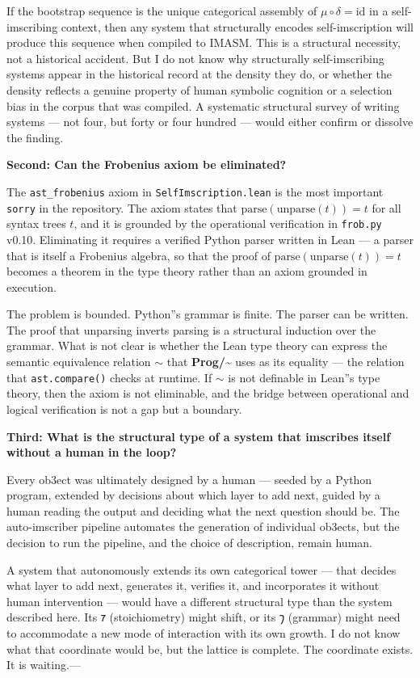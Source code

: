 \documentclass[12pt,a4paper]{article}
\begin{document}
If the bootstrap sequence is the unique categorical assembly of $\mu\circ\delta = \mathrm{id}$ in a self-imscribing context, then any system that structurally encodes self-imscription will produce this sequence when compiled to IMASM. This is a structural necessity, not a historical accident. But I do not know why structurally self-imscribing systems appear in the historical record at the density they do, or whether the density reflects a genuine property of human symbolic cognition or a selection bias in the corpus that was compiled. A systematic structural survey of writing systems --- not four, but forty or four hundred --- would either confirm or dissolve the finding.

\textbf{Second: Can the Frobenius axiom be eliminated?}

The \texttt{ast\_frobenius} axiom in \texttt{SelfImscription.lean} is the most important \texttt{sorry} in the repository. The axiom states that $\text{parse}(\text{unparse}(t)) = t$ for all syntax trees $t$, and it is grounded by the operational verification in \texttt{frob.py} v0.10. Eliminating it requires a verified Python parser written in Lean --- a parser that is itself a Frobenius algebra, so that the proof of $\text{parse}(\text{unparse}(t)) = t$ becomes a theorem in the type theory rather than an axiom grounded in execution.

The problem is bounded. Python''s grammar is finite. The parser can be written. The proof that unparsing inverts parsing is a structural induction over the grammar. What is not clear is whether the Lean type theory can express the semantic equivalence relation $\sim$ that \textbf{Prog/\textasciitilde{}} uses as its equality --- the relation that \texttt{ast.compare()} checks at runtime. If $\sim$ is not definable in Lean''s type theory, then the axiom is not eliminable, and the bridge between operational and logical verification is not a gap but a boundary.

\textbf{Third: What is the structural type of a system that imscribes itself without a human in the loop?}

Every ob3ect was ultimately designed by a human --- seeded by a Python program, extended by decisions about which layer to add next, guided by a human reading the output and deciding what the next question should be. The auto-imscriber pipeline automates the generation of individual ob3ects, but the decision to run the pipeline, and the choice of description, remain human.

A system that autonomously extends its own categorical tower --- that decides what layer to add next, generates it, verifies it, and incorporates it without human intervention --- would have a different structural type than the system described here. Its $\text{𐑳}$ (stoichiometry) might shift, or its $\text{𐑠}$ (grammar) might need to accommodate a new mode of interaction with its own growth. I do not know what that coordinate would be, but the lattice is complete. The coordinate exists. It is waiting.---
\end{document}
